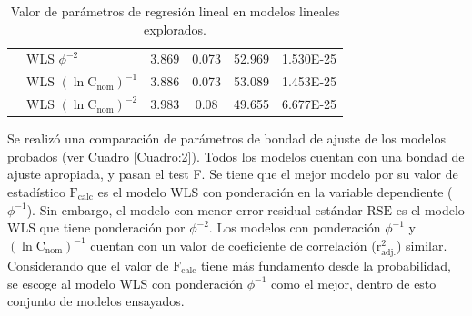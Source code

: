 \documentclass{article}
\begin{document}
\begin{table}[H]
\begin{tabular}{clcccc}
	                                      &  WLS $\phi^{-2}$                                  & 3.869 & 0.073 & 52.969 & 1.530E-25\\
	                                      &  WLS $ \left(\ln{\mathrm{C_{nom}}}\right)^{-1} $  & 3.886 & 0.073 & 53.089 & 1.453E-25\\
	                                      &  WLS $ \left(\ln{\mathrm{C_{nom}}}\right)^{-2} $  & 3.983 & 0.08 & 49.655 & 6.677E-25\\
	\hline
\end{tabular} 
\caption{Valor de parámetros de regresión lineal en modelos lineales explorados.}
\label{Cuadro:1}
\end{table}

Se realizó una comparación de parámetros de bondad de ajuste de los modelos probados (ver Cuadro \ref{Cuadro:2}). Todos los modelos cuentan con una bondad de ajuste apropiada, y pasan el test F. Se tiene que el mejor modelo por su valor de estadístico $ \mathrm{F_{calc}} $ es el modelo WLS con ponderación en la variable dependiente ($\phi^{-1}$). Sin embargo, el modelo con menor error residual estándar $\mathrm{RSE}$ es el modelo WLS que tiene ponderación por $\phi^{-2}$. Los modelos con ponderación $\phi^{-1}$ y $\left(\ln{\mathrm{C_{nom}}}\right)^{-1}$ cuentan con un valor de coeficiente de correlación ($ \mathrm{r^{2}_{adj.}} $) similar. Considerando que el valor de $\mathrm{F_{calc}}$ tiene más fundamento desde la probabilidad, se escoge al modelo WLS con ponderación $\phi^{-1}$ como el mejor, dentro de esto conjunto de modelos ensayados.\\
\end{document}
